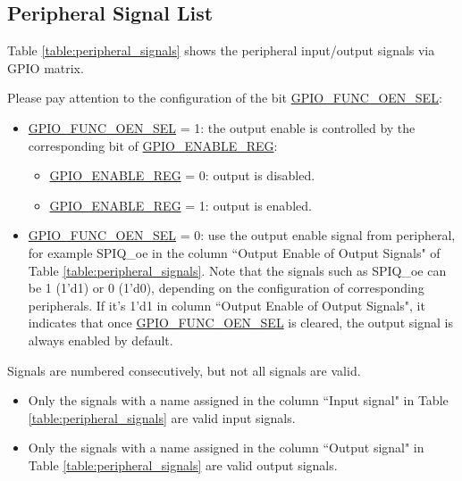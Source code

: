\documentclass[main\_\_EN.tex]{subfiles}
\begin{document}
\begin{landscape}
\section{Peripheral Signal List}
\label{sec:peripheral_signals}


Table \ref{table:peripheral_signals} shows the peripheral input/output signals via GPIO matrix.

Please pay attention to the configuration of the bit \hyperref[fielddesc:GPIOFUNCNOENSEL]{GPIO\_FUNC\_OEN\_SEL}:

\begin{itemize}
    \item \hyperref[fielddesc:GPIOFUNCNOENSEL]{GPIO\_FUNC\_OEN\_SEL} = 1: the output enable is controlled by the corresponding bit  of \hyperref[regdesc:GPIOENABLEREG]{GPIO\_ENABLE\_REG}:
    \begin{itemize}
        \item \hyperref[regdesc:GPIOENABLEREG]{GPIO\_ENABLE\_REG} = 0: output is disabled.
        \item \hyperref[regdesc:GPIOENABLEREG]{GPIO\_ENABLE\_REG} = 1: output is enabled.
    \end{itemize}
    \item \hyperref[fielddesc:GPIOFUNCNOENSEL]{GPIO\_FUNC\_OEN\_SEL} = 0: use the output enable signal from peripheral, for example SPIQ\_oe in the column ``Output Enable of Output Signals" of Table \ref{table:peripheral_signals}. Note that the signals such as SPIQ\_oe can be 1 (1'd1) or 0 (1'd0), depending on the configuration of corresponding peripherals. If it's 1'd1 in column ``Output Enable of Output Signals", it indicates that once \hyperref[fielddesc:GPIOFUNCNOENSEL]{GPIO\_FUNC\_OEN\_SEL} is cleared, the output signal is always enabled by default.
\end{itemize}

\begin{tiplisting}
Signals are numbered consecutively, but not all signals are valid.
\vspace{-1em}
\begin{itemize}
    \item Only the signals with a name assigned in the column ``Input signal" in Table \ref{table:peripheral_signals} are valid input signals.
    \item Only the signals with a name assigned in the column ``Output signal" in Table \ref{table:peripheral_signals} are valid output signals.
\end{itemize}
\end{tiplisting}


\end{landscape}
\end{document}
